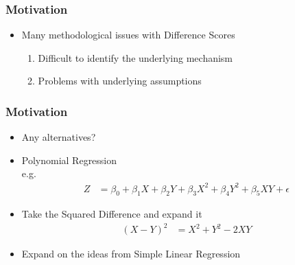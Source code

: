 \documentclass{beamer}\usepackage[]{graphicx}\usepackage[]{color}
\begin{document}
\begin{frame}
\frametitle{Motivation}
\begin{itemize}
  \item Many methodological issues with Difference Scores
  \begin{enumerate}
    \item Difficult to identify the underlying mechanism
    \item Problems with underlying assumptions
  \end{enumerate}
\end{itemize}
\end{frame}


\begin{frame}
\frametitle{Motivation}
\begin{itemize}
  \item Any alternatives?
  \item Polynomial Regression \\ e.g.
  \begin{align}
    Z &= \beta_0 + \beta_1 X + \beta_2 Y + \beta_3 X^2 + \beta_4 Y^2 + \beta_5 XY + \epsilon
  \end{align}
  \item Take the Squared Difference and expand it
    \begin{align}
    (X-Y)^2 &= X^2 + Y^2 -2XY
  \end{align}
  \item Expand on the ideas from Simple Linear Regression
\end{itemize}
\end{frame}


\end{document}
